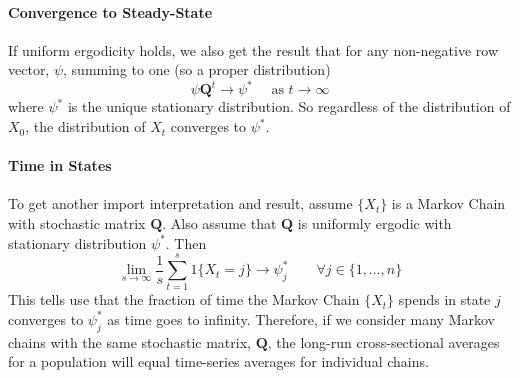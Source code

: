 \documentclass[a4paper,12pt]{scrartcl}
\begin{document}
\paragraph{Convergence to Steady-State}
If uniform ergodicity holds, we also get the result that
for any non-negative row vector, $\psi$, summing to one (so a
proper distribution)
\[ \psi \mathbf{Q}^t \rightarrow \psi^* \quad \text{ as }
	t\rightarrow \infty \]
where $\psi^*$ is the unique stationary distribution. So
regardless of the distribution of $X_0$, the distribution 
of $X_t$ converges to $\psi^*$.

\paragraph{Time in States} To get another import interpretation
and result, assume $\{X_t\}$ is a Markov Chain with stochastic 
matrix $\mathbf{Q}$. Also assume that $\mathbf{Q}$ is 
uniformly ergodic with stationary distribution $\psi^*$. Then
\begin{equation}
    \lim_{s\rightarrow\infty}
    \frac{1}{s} \sum^s_{t=1} 1\{X_t = j\} \rightarrow
	\psi^*_j  \qquad
	\forall j \in \{1, \ldots, n\}
\end{equation}
This tells use that the fraction of time the Markov Chain
$\{X_t\}$ spends in state $j$ converges to $\psi^*_j$ as
time goes to infinity.  Therefore, if we consider many
Markov chains with the same stochastic matrix, $\mathbf{Q}$,
the long-run cross-sectional averages for a population will
equal time-series averages for individual chains.
\end{document}
